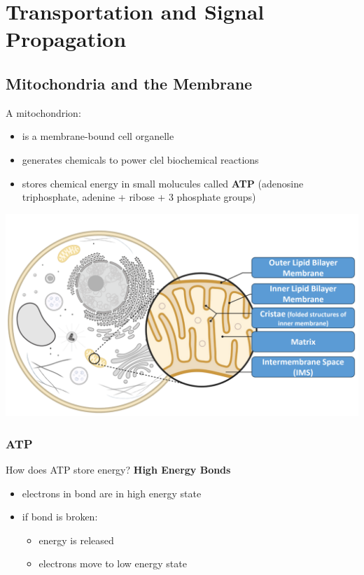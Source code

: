 \documentclass[11pt,fleqn]{book}
\begin{document}
\chapter{Transportation and Signal Propagation}
\section{Mitochondria and the Membrane}
A mitochondrion:
\begin{itemize}
    \item is a membrane-bound cell organelle
    \item generates chemicals to power clel biochemical reactions
    \item stores chemical energy in small molucules called \textbf{ATP} (adenosine triphosphate, adenine + ribose + 3 phosphate groups)
\end{itemize}
\begin{center}
    \includegraphics[width=0.65\linewidth]{Pictures/Screenshot 2024-02-25 191455.png}
\end{center}
\subsection{ATP}
How does ATP store energy?
\textbf{High Energy Bonds}
\begin{itemize}
    \item electrons in bond are in high energy state
    \item if bond is broken:
    \begin{itemize}
        \item energy is released
        \item electrons move to low energy state
    \end{itemize}
\end{itemize} 
\end{document}
